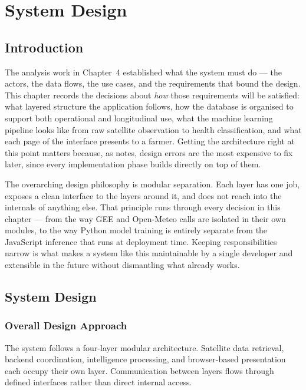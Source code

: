 \chapter{System Design}

\section{Introduction}

The analysis work in Chapter~4 established what the system must do — the actors, the data flows, the use cases, and the requirements that bound the design. This chapter records the decisions about \emph{how} those requirements will be satisfied: what layered structure the application follows, how the database is organised to support both operational and longitudinal use, what the machine learning pipeline looks like from raw satellite observation to health classification, and what each page of the interface presents to a farmer. Getting the architecture right at this point matters because, as \citet{sommerville2016} notes, design errors are the most expensive to fix later, since every implementation phase builds directly on top of them.

The overarching design philosophy is modular separation. Each layer has one job, exposes a clean interface to the layers around it, and does not reach into the internals of anything else. That principle runs through every decision in this chapter — from the way GEE and Open-Meteo calls are isolated in their own modules, to the way Python model training is entirely separate from the JavaScript inference that runs at deployment time. Keeping responsibilities narrow is what makes a system like this maintainable by a single developer and extensible in the future without dismantling what already works.

\section{System Design}

\subsection*{Overall Design Approach}

The system follows a four-layer modular architecture. Satellite data retrieval, backend coordination, intelligence processing, and browser-based presentation each occupy their own layer. Communication between layers flows through defined interfaces rather than direct internal access.


